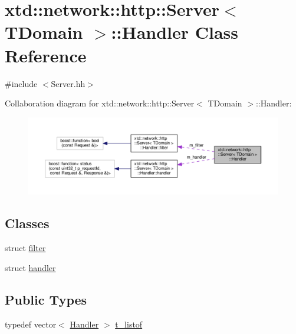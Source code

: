 \hypertarget{classxtd_1_1network_1_1http_1_1Server_1_1Handler}{\section{xtd\-:\-:network\-:\-:http\-:\-:Server$<$ T\-Domain $>$\-:\-:Handler Class Reference}
\label{classxtd_1_1network_1_1http_1_1Server_1_1Handler}
}


{\ttfamily \#include $<$Server.\-hh$>$}



Collaboration diagram for xtd\-:\-:network\-:\-:http\-:\-:Server$<$ T\-Domain $>$\-:\-:Handler\-:
\nopagebreak
\begin{figure}[H]
\begin{center}
\leavevmode
\includegraphics[width=350pt]{classxtd_1_1network_1_1http_1_1Server_1_1Handler__coll__graph}
\end{center}
\end{figure}
\subsection*{Classes}
\begin{DoxyCompactItemize}
\item 
struct \hyperlink{structxtd_1_1network_1_1http_1_1Server_1_1Handler_1_1filter}{filter}
\item 
struct \hyperlink{structxtd_1_1network_1_1http_1_1Server_1_1Handler_1_1handler}{handler}
\end{DoxyCompactItemize}
\subsection*{Public Types}
\begin{DoxyCompactItemize}
\item 
typedef vector$<$ \hyperlink{classxtd_1_1network_1_1http_1_1Server_1_1Handler}{Handler} $>$ \hyperlink{classxtd_1_1network_1_1http_1_1Server_1_1Handler_af76f154d74b7f92f26852b8ea4829b72}{t\-\_\-listof}
\end{DoxyCompactItemize}
